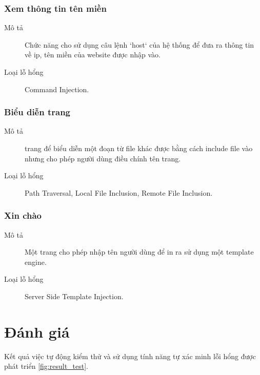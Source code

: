 \documentclass[./../main.tex]{subfiles}
\begin{document}
\subsubsection{Xem thông tin tên miền}

\begin{description}
	\item[Mô tả] Chức năng cho sử dụng câu lệnh `host` của hệ thống để đưa ra thông tin về ip, tên miền của website được nhập vào.
	\item[Loại lỗ hổng] Command Injection.
\end{description}

\subsubsection{Biểu diễn trang}

\begin{description}
	\item[Mô tả] trang để biểu diễn một đoạn từ file khác được bằng cách
	      include file vào nhưng cho phép người dùng điều chính tên trang.
	\item[Loại lỗ hổng] Path Traversal, Local File Inclusion, Remote
	      File Inclusion.
\end{description}

\subsubsection{Xin chào}

\begin{description}
	\item[Mô tả] Một trang cho phép nhập tên người dùng để in ra sử dụng một template engine.
	\item[Loại lỗ hổng] Server Side Template Injection.
\end{description}


\section{Đánh giá}

Kết quả việc tự động kiểm thử và sử dụng tính năng tự xác minh lỗi
hổng được phát triển \ref{fig:result_test}.
\end{document}
